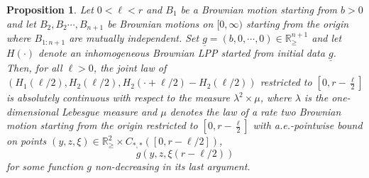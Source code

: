 \documentclass[11pt, reqno]{amsart}
\numberwithin{equation}{section}
\newcounter{dummy} \numberwithin{dummy}{section}
\newtheorem{proposition}[dummy]{Proposition}
\newcommand{\R}{\ensuremath{\mathbb{R}}}
\begin{document}
\begin{proposition}\label{prop: top line pitman pointwise bound general case special coupling} Let $0<\ell<r$ and $B_{1}$ be a Brownian motion starting from $b>0$ and let $B_2,B_2\cdots, B_{n+1}$ be Brownian motions on $[0,\infty)$ starting from the origin where $B_{1:n+1}$ are mutually independent. Set $\underline{g}=(b,0,\cdots, 0)\in\R^{n+1}_\ge$ and let $H(\cdot)$ denote an inhomogeneous Brownian LPP started from initial data $\underline{g}$. Then, for all $\ell>0$, the joint law of $(H_1(\ell/2), H_2 (\ell/2), H_2(\cdot + \ell/2)-H_2(\ell/2))$ restricted to $[0,r-\frac{\ell}{2}]$ is absolutely continuous with respect to the measure $\lambda^2\times \mu$, where $\lambda$ is the one-dimensional Lebesgue measure and $\mu$ denotes the law of a rate two Brownian motion starting from the origin restricted to $[0,r-\frac{\ell}{2}]$ with a.e.-pointwise bound on points $(y, z,  \xi)\in \R^2_\ge\times C_{*,*}([0,r-\ell/2])$,
$$
g(y,z,\xi(r-\ell/2))
$$
for some function $g$ non-decreasing in its last argument.
\end{proposition}
\end{document}

